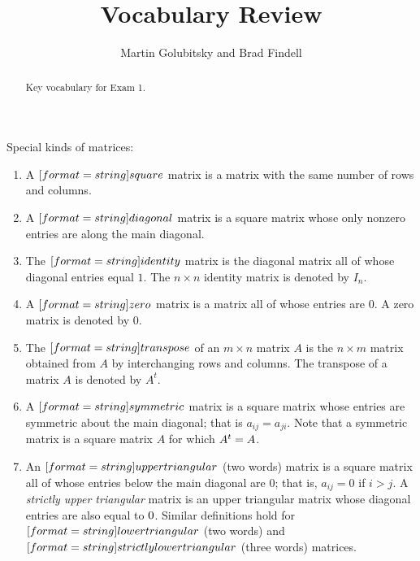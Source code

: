 \documentclass{ximera}
\title{Vocabulary Review}
\author{Martin Golubitsky and Brad Findell}
\begin{document}
\begin{abstract}
Key vocabulary for Exam 1.
\end{abstract}
\maketitle


\begin{question}
Special kinds of matrices:  
\begin{enumerate}

\item A $[format=string]{square}$ matrix is a matrix
with the same number of rows and columns.  

\item A $[format=string]{diagonal}$ matrix is a
square matrix whose only nonzero entries are along the main diagonal. 

\item The $[format=string]{identity}$ matrix is the 
diagonal matrix all of whose diagonal entries equal $1$.  The
$n\times n$ identity matrix is denoted by $I_n$.  

\item A $[format=string]{zero}$ matrix  is a matrix all
of whose entries are $0$. A zero matrix is denoted by $0$.  

\item The $[format=string]{transpose}$ of an $m\times n$
matrix $A$ is the $n\times m$ matrix obtained from $A$ by
interchanging rows and columns.  The transpose of a matrix $A$ is denoted by $A^t$.  

\item A $[format=string]{symmetric}$ matrix is a square matrix whose entries are symmetric about the main
diagonal; that is $a_{ij}=a_{ji}$.  Note that a symmetric matrix
is a square matrix $A$ for which $A^t={A}$.

\item An $[format=string]{upper triangular}$ (two words) matrix is a square matrix all of whose entries below the
main diagonal are $0$; that is, $a_{ij}=0$ if $i>j$.  
A {\em strictly upper triangular} matrix is an upper triangular
matrix whose diagonal entries are also equal to ${0}$.  Similar
definitions hold for $[format=string]{lower triangular}$ (two words)
and $[format=string]{strictly lower triangular}$ (three words) matrices.  

\end{enumerate}
\end{question}
\end{document}
